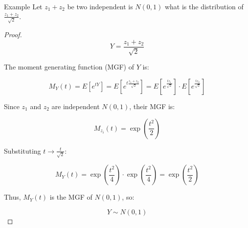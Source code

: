 \documentclass[a4paper]{article}
\begin{document}
\begin{note}{Example}
  Let $z_1 + z_2$ be two independent is $N(0,1)$ what is the distribution of  $\frac{z_1 + z_2}{\sqrt{2} }$.

  \begin{proof}
    \[
Y = \frac{z_1 + z_2}{\sqrt{2}}
\]

The moment generating function (MGF) of $Y$ is:

\[
M_Y(t) = E\left[ e^{tY} \right] = E\left[ e^{t \frac{z_1 + z_2}{\sqrt{2}}} \right] = E\left[ e^{\frac{tz_1}{\sqrt{2}}} \right] \cdot E\left[ e^{\frac{tz_2}{\sqrt{2}}} \right]
\]

Since $z_1$ and $z_2$ are independent $N(0,1)$, their MGF is:

\[
M_{z_i}(t) = \exp\left( \frac{t^2}{2} \right)
\]

Substituting $t \to \frac{t}{\sqrt{2}}$:

\[
M_Y(t) = \exp\left( \frac{t^2}{4} \right) \cdot \exp\left( \frac{t^2}{4} \right) = \exp\left( \frac{t^2}{2} \right)
\]

Thus, $M_Y(t)$ is the MGF of $N(0,1)$, so:

\[
Y \sim N(0,1)
\]
  \end{proof}
\end{note}
\end{document}
